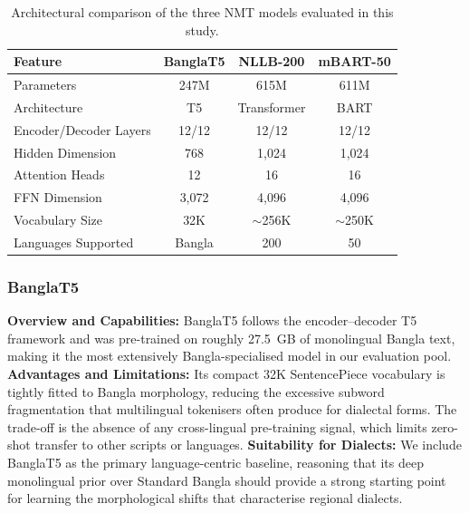 \documentclass[12pt,a4paper]{article}
\begin{document}
\begin{table}[htbp]
\centering
\caption{Architectural comparison of the three NMT models evaluated in this study.}
\label{tab:model_specs}
\begin{tabular}{l c c c}
\toprule
\textbf{Feature} & \textbf{BanglaT5} & \textbf{NLLB-200} & \textbf{mBART-50} \\
\midrule
Parameters          & 247M    & 615M    & 611M \\
Architecture        & T5      & Transformer & BART \\
Encoder/Decoder Layers & 12/12 & 12/12 & 12/12 \\
Hidden Dimension    & 768     & 1,024   & 1,024 \\
Attention Heads     & 12      & 16      & 16 \\
FFN Dimension       & 3,072   & 4,096   & 4,096 \\
Vocabulary Size     & 32K     & $\sim$256K & $\sim$250K \\
Languages Supported & Bangla  & 200     & 50 \\
\bottomrule
\end{tabular}
\end{table}

\subsubsection{BanglaT5}
\textbf{Overview and Capabilities:} BanglaT5 \cite{bhattacharjee-etal-2023-banglanlg} follows the encoder--decoder T5 \cite{raffel2020exploring} framework and was pre-trained on roughly 27.5~GB of monolingual Bangla text, making it the most extensively Bangla-specialised model in our evaluation pool.
\textbf{Advantages and Limitations:} Its compact 32K SentencePiece vocabulary is tightly fitted to Bangla morphology, reducing the excessive subword fragmentation that multilingual tokenisers often produce for dialectal forms. The trade-off is the absence of any cross-lingual pre-training signal, which limits zero-shot transfer to other scripts or languages.
\textbf{Suitability for Dialects:} We include BanglaT5 as the primary language-centric baseline, reasoning that its deep monolingual prior over Standard Bangla should provide a strong starting point for learning the morphological shifts that characterise regional dialects.
\end{document}
